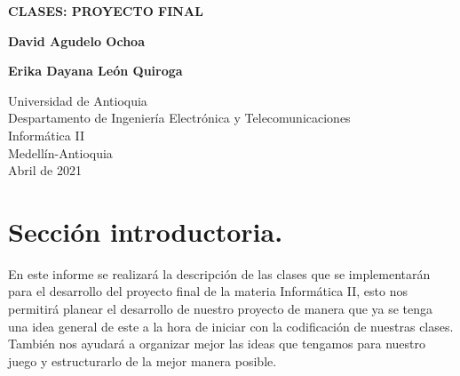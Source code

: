 \documentclass{article}
\begin{document}
\begin{titlepage}
    \begin{center}
        \vspace*{0cm}
            
        \large
        \textbf{CLASES: PROYECTO FINAL}
            

        \vspace{8cm}
            
        \textbf{David Agudelo Ochoa}
        
        \vspace{0.5cm}
        
        \textbf{Erika Dayana León Quiroga}
            
        \vfill
            
        \vspace{0.8cm}
            
        \Large
        Universidad de Antioquia\\
        Despartamento de Ingeniería Electrónica y Telecomunicaciones\\
        Informática II\\
        Medellín-Antioquia\\
        Abril de 2021
            
    \end{center}
\end{titlepage}

\tableofcontents
\newpage
\section{Sección introductoria.}\label{intro}

En este informe se realizará la descripción de las clases que se implementarán para el desarrollo del proyecto final de la materia Informática II, esto nos permitirá planear el desarrollo de nuestro proyecto de manera que ya se tenga una idea general de este a la hora de iniciar con la codificación de nuestras clases. También nos ayudará a organizar mejor las ideas que tengamos para nuestro juego y estructurarlo de la mejor manera posible.
\end{document}
